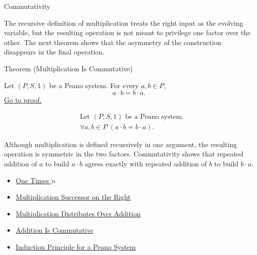 \begin{topicbox}{Commutativity}
\begin{exposition}
The recursive definition of multiplication treats the right input as the
evolving variable, but the resulting operation is not meant to privilege one
factor over the other. The next theorem shows that the asymmetry of the
construction disappears in the final operation.
\end{exposition}

\begin{theorembox}{Theorem (Multiplication Is Commutative)}
\begin{theorem}
\label{thm:multiplication-commutative}
Let $(P,S,1)$ be a Peano system. For every $a,b \in P$,
\[
a \cdot b = b \cdot a.
\]
\hyperref[prf:multiplication-commutative]{Go to proof.}
\end{theorem}
\end{theorembox}

\begin{remark*}
\[
\begin{aligned}
&\text{Let } (P,S,1) \text{ be a Peano system.}\\
&\forall a,b \in P\;(a \cdot b = b \cdot a).
\end{aligned}
\]
\end{remark*}

\begin{remark*}[Interpretation]
Although multiplication is defined recursively in one argument, the resulting
operation is symmetric in the two factors. Commutativity shows that repeated
addition of $a$ to build $a \cdot b$ agrees exactly with repeated addition of
$b$ to build $b \cdot a$.
\end{remark*}

\begin{dependencies}
\begin{itemize}
  \item \hyperref[thm:one-times-n]{One Times $n$}
  \item \hyperref[thm:multiplication-successor-on-right]{Multiplication Successor on the Right}
  \item \hyperref[thm:multiplication-distributes-over-addition]{Multiplication Distributes Over Addition}
  \item \hyperref[thm:addition-commutative]{Addition Is Commutative}
  \item \hyperref[thm:induction-principle-for-peano-system]{Induction Principle for a Peano System}
\end{itemize}
\end{dependencies}
\end{topicbox}

